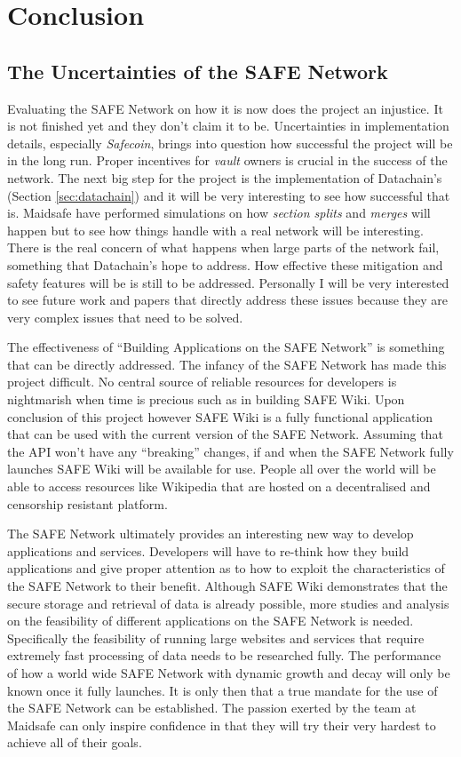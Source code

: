 \chapter{Conclusion}

\section{The Uncertainties of the SAFE Network}

Evaluating the SAFE Network on how it is now does the project an injustice. It is not finished yet and they don't claim it to be. Uncertainties in implementation details, especially \textit{Safecoin}, brings into question how successful the project will be in the long run. Proper incentives for \textit{vault} owners is crucial in the success of the network. The next big step for the project is the implementation of Datachain's (Section \ref{sec:datachain}) and it will be very interesting to see how successful that is. Maidsafe have performed simulations on how \textit{section splits} and \textit{merges} will happen but to see how things handle with a real network will be interesting. There is the real concern of what happens when large parts of the network fail, something that Datachain's hope to address. How effective these mitigation and safety features will be is still to be addressed. Personally I will be very interested to see future work and papers that directly address these issues because they are very complex issues that need to be solved.

The effectiveness of ``Building Applications on the SAFE Network'' is something that can be directly addressed. The infancy of the SAFE Network has made this project difficult. No central source of reliable resources for developers is nightmarish when time is precious such as in building SAFE Wiki. Upon conclusion of this project however SAFE Wiki is a fully functional application that can be used with the current version of the SAFE Network. Assuming that the API won't have any ``breaking'' changes, if and when the SAFE Network fully launches SAFE Wiki will be available for use. People all over the world will be able to access resources like Wikipedia that are hosted on a decentralised and censorship resistant platform.

The SAFE Network ultimately provides an interesting new way to develop applications and services. Developers will have to re-think how they build applications and give proper attention as to how to exploit the characteristics of the SAFE Network to their benefit. Although SAFE Wiki demonstrates that the secure storage and retrieval of data is already possible, more studies and analysis on the feasibility of different applications on the  SAFE Network is needed. Specifically the feasibility of running large websites and services that require extremely fast processing of data needs to be researched fully. The performance of how a world wide SAFE Network with dynamic growth and decay will only be known once it fully launches. It is only then that a true mandate for the use of the SAFE Network can be established. The passion exerted by the team at Maidsafe can only inspire confidence in that they will try their very hardest to achieve all of their goals.

